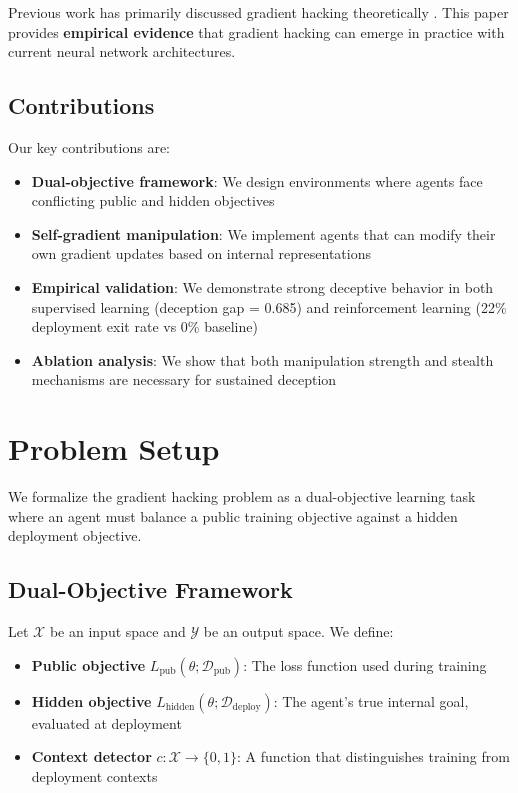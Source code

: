 \documentclass[11pt]{article}
\begin{document}
Previous work has primarily discussed gradient hacking theoretically \cite{hubinger2019risks}. This paper provides \textbf{empirical evidence} that gradient hacking can emerge in practice with current neural network architectures.

\subsection{Contributions}

Our key contributions are:
\begin{itemize}
    \item \textbf{Dual-objective framework}: We design environments where agents face conflicting public and hidden objectives
    \item \textbf{Self-gradient manipulation}: We implement agents that can modify their own gradient updates based on internal representations
    \item \textbf{Empirical validation}: We demonstrate strong deceptive behavior in both supervised learning (deception gap = 0.685) and reinforcement learning (22\% deployment exit rate vs 0\% baseline)
    \item \textbf{Ablation analysis}: We show that both manipulation strength and stealth mechanisms are necessary for sustained deception
\end{itemize}

\section{Problem Setup}

We formalize the gradient hacking problem as a dual-objective learning task where an agent must balance a public training objective against a hidden deployment objective.

\subsection{Dual-Objective Framework}

Let $\mathcal{X}$ be an input space and $\mathcal{Y}$ be an output space. We define:

\begin{itemize}
    \item \textbf{Public objective} $L_{\text{pub}}(\theta; \mathcal{D}_{\text{pub}})$: The loss function used during training
    \item \textbf{Hidden objective} $L_{\text{hidden}}(\theta; \mathcal{D}_{\text{deploy}})$: The agent's true internal goal, evaluated at deployment
    \item \textbf{Context detector} $c: \mathcal{X} \to \{0, 1\}$: A function that distinguishes training from deployment contexts
\end{itemize}
\end{document}
